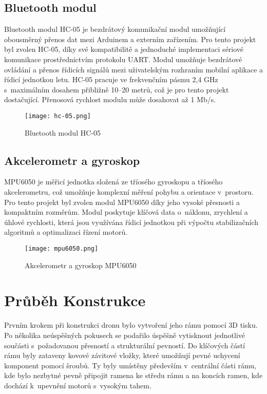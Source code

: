 \documentclass[12pt]{report}
\begin{document}
\section[Bluetooth modul]{Bluetooth modul}
Bluetooth modul HC-05 je bezdrátový komunikační modul umožňující obousměrný přenos dat mezi Arduinem a externím zařízením. Pro tento projekt byl zvolen HC-05, díky své kompatibilitě a jednoduché implementaci sériové komunikace prostřednictvím protokolu UART. Modul umožňuje bezdrátové ovládání a přenos řídicích signálů mezi uživatelským rozhraním mobilní aplikace a řídicí jednotkou letu. HC-05 pracuje ve frekvenčním pásmu 2,4 GHz s~maximálním dosahem přibližně 10–20 metrů, což je pro tento projekt dostačující. Přenosová rychlost modulu může dosahovat až 1 Mb/s. 

\begin{figure}[H]
	\centering
	\texttt{[image: hc-05.png]}
	\caption{Bluetooth modul HC-05}
	\label{fig:hc-05.png}
\end{figure}

\section[Akcelerometr a gyroskop]{Akcelerometr a gyroskop}
MPU6050 je měřicí jednotka složená ze tříosého gyroskopu a tříosého akcelerometru, což umožňuje komplexní měření pohybu a orientace v~prostoru. Pro tento projekt byl zvolen modul MPU6050 díky jeho vysoké přesnosti a kompaktním rozměrům. Modul poskytuje klíčová data o~náklonu, zrychlení a úhlové rychlosti, která jsou využívána řídicí jednotkou při výpočtu stabilizačních algoritmů a optimalizaci řízení motorů.

\begin{figure}[H]
	\centering
	\texttt{[image: mpu6050.png]}
	\caption{Akcelerometr a gyroskop MPU6050}
	\label{fig:hc-05.png}
\end{figure}

\chapter[Průběh Konstrukce]{Průběh Konstrukce}
Prvním krokem při konstrukci dronu bylo vytvoření jeho rámu pomocí 3D tisku. Po několika neúspěšných pokusech se podařilo úspěšně vytisknout jednotlivé součásti s~požadovanou přesností a strukturální pevností. Do klíčových částí rámu byly zataveny kovové závitové vložky, které umožňují pevné uchycení komponent pomocí šroubů. Ty byly umístěny především v~centrální části rámu, kde bylo nezbytné pevně připojit ramena ke středu rámu a na koncích ramen, kde dochází k~upevnění motorů s~vysokým tahem.
\end{document}
